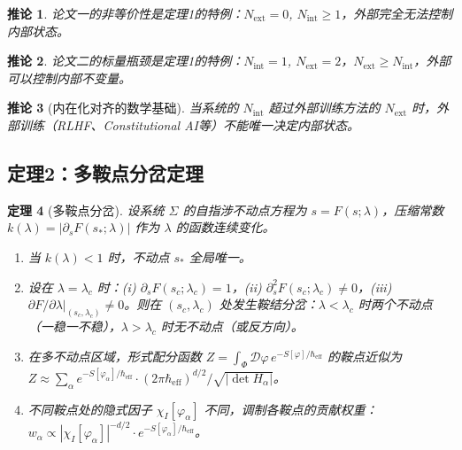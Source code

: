 \documentclass[12pt,a4paper]{article}
\newtheorem{theorem}{定理}[section]
\newtheorem{corollary}[theorem]{推论}
\theoremstyle{definition}
\newcommand{\mPhi}{\Phi}
\newcommand{\chiI}{\chi_I}
\newcommand{\Heff}{\hbar_{\mathrm{eff}}}
\newcommand{\Nint}{N_{\mathrm{int}}}
\newcommand{\Next}{N_{\mathrm{ext}}}
\begin{document}
\begin{corollary}
\label{cor:t1-paper1}
论文一的非等价性是定理1的特例：$\Next = 0$, $\Nint \geq 1$，外部完全无法控制内部状态。
\end{corollary}

\begin{corollary}
\label{cor:t1-paper2}
论文二的标量瓶颈是定理1的特例：$\Nint = 1$, $\Next = 2$，$\Next \geq \Nint$，外部可以控制内部不变量。
\end{corollary}

\begin{corollary}[内在化对齐的数学基础]
\label{cor:t1-align}
当系统的 $\Nint$ 超过外部训练方法的 $\Next$ 时，外部训练（RLHF、Constitutional AI等）不能唯一决定内部状态。
\end{corollary}

\subsection{定理2：多鞍点分岔定理}

\begin{theorem}[多鞍点分岔]
\label{thm:t2}
设系统 $\Sigma$ 的自指涉不动点方程为 $s = F(s; \lambda)$，压缩常数 $k(\lambda) = |\partial_s F(s_*; \lambda)|$ 作为 $\lambda$ 的函数连续变化。
\begin{enumerate}[label=(T2-\alph*)]
\item 当 $k(\lambda) < 1$ 时，不动点 $s_*$ 全局唯一。
\item 设在 $\lambda = \lambda_c$ 时：(i) $\partial_s F(s_c; \lambda_c) = 1$，(ii) $\partial_s^2 F(s_c; \lambda_c) \neq 0$，(iii) $\partial F/\partial\lambda|_{(s_c, \lambda_c)} \neq 0$。则在 $(s_c, \lambda_c)$ 处发生\emph{鞍结分岔}：$\lambda < \lambda_c$ 时两个不动点（一稳一不稳），$\lambda > \lambda_c$ 时无不动点（或反方向）。
\item 在多不动点区域，形式配分函数 $Z = \int_\mPhi \mathcal{D}\varphi \, e^{-S[\varphi]/\Heff}$ 的鞍点近似为 $Z \approx \sum_\alpha e^{-S[\varphi_\alpha]/\Heff} \cdot (2\pi\Heff)^{d/2} / \sqrt{|\det H_\alpha|}$。
\item 不同鞍点处的隐式因子 $\chiI[\varphi_\alpha]$ 不同，调制各鞍点的贡献权重：$w_\alpha \propto |\chiI[\varphi_\alpha]|^{-d/2} \cdot e^{-S[\varphi_\alpha]/\Heff}$。
\end{enumerate}
\end{theorem}
\end{document}
